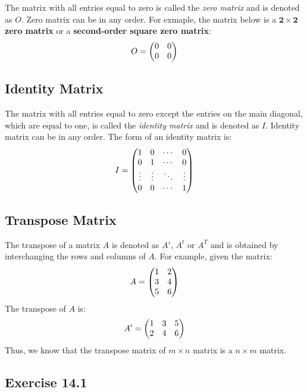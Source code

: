\documentclass{report}
\begin{document}
\begin{multicols}{2}
  \doublespacing{}

  The matrix with all entries equal to zero is called the \emph{zero matrix} and
  is denoted as $O$. Zero matrix can be in any order. For exmaple, the matrix
  below is a \textbf{$\mathbf{2 \times 2}$ zero matrix} or a \textbf{second-order
    square zero matrix}:
  \[
    O = \begin{pmatrix}
      0 & 0 \\
      0 & 0
    \end{pmatrix}
  \]

  \singlespacing{}

  \subsection*{Identity Matrix}

  \doublespacing{}

  The matrix with all entries equal to zero except the entries on the main
  diagonal, which are equal to one, is called the \emph{identity matrix} and is
  denoted as $I$. Identity matrix can be in any order. The form of an identity
  matrix is:
  \[
    I = \begin{pmatrix}
      1      & 0      & \cdots & 0      \\
      0      & 1      & \cdots & 0      \\
      \vdots & \vdots & \ddots & \vdots \\
      0      & 0      & \cdots & 1
    \end{pmatrix}
  \]

  \singlespacing{}

  \subsection*{Transpose Matrix}

  \doublespacing{}

  The transpose of a matrix $A$ is denoted as $A'$, $A^t$ or $A^T$ and is
  obtained by interchanging the rows and columns of $A$. For example, given the
  matrix:
  \[
    A = \begin{pmatrix}
      1 & 2 \\
      3 & 4 \\
      5 & 6
    \end{pmatrix}
  \]
  The transpose of $A$ is:
  \[
    A' = \begin{pmatrix}
      1 & 3 & 5 \\
      2 & 4 & 6
    \end{pmatrix}
  \]
  Thus, we know that the transpose matrix of $m \times n$ matrix is a $n \times
    m$ matrix.

  \singlespacing{}

  \subsection{Exercise 14.1}


\end{multicols}
\end{document}
